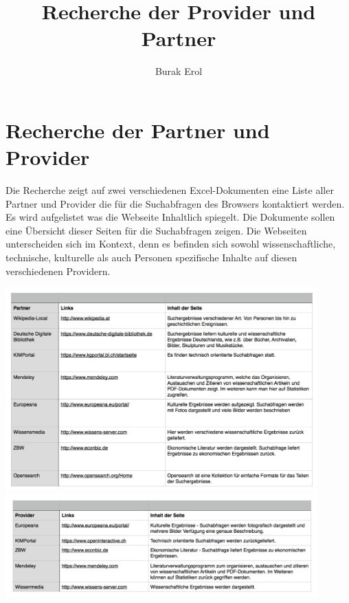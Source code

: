 
\title{Recherche der Provider und Partner}
\author{Burak Erol}


\section{Recherche der Partner und Provider}

Die Recherche zeigt auf zwei verschiedenen Excel-Dokumenten eine Liste aller Partner und Provider die für die Suchabfragen des Browsers kontaktiert werden. Es wird aufgelistet was die Webseite Inhaltlich spiegelt. Die Dokumente sollen eine Übersicht dieser Seiten für die Suchabfragen zeigen. Die Webseiten unterscheiden sich im Kontext, denn es befinden sich sowohl wissenschaftliche, technische, kulturelle als auch Personen spezifische Inhalte auf diesen verschiedenen Providern.

\includegraphics[width=12cm]{Pics/PartnerList}
\newpage
\includegraphics[width=12cm]{Pics/ProviderList}